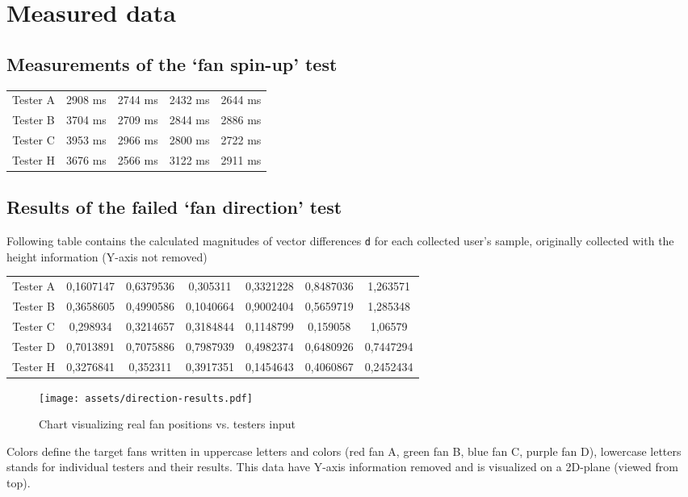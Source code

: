 \chapter{Measured data}

\label{appx:a}
\section{Measurements of the `fan spin-up' test}

\begin{center}
    \begin{tabular}{|c|c|c|c|c|}
    \hline
    Tester A & 2908 ms & 2744 ms & 2432 ms & 2644 ms \\
    Tester B & 3704 ms & 2709 ms & 2844 ms & 2886 ms \\
    Tester C & 3953 ms & 2966 ms & 2800 ms & 2722 ms \\
    Tester H & 3676 ms & 2566 ms & 3122 ms & 2911 ms \\
    \hline
\end{tabular}
\end{center}

\label{appx:b}
\section{Results of the failed `fan direction' test}
Following table contains the calculated magnitudes of vector differences \texttt{d}
for each collected user’s sample, originally collected with the
height information (Y-axis not removed)


\begin{center}
\begin{tabular}{|c|c|c|c|c|c|c|}
\hline
Tester A & 0,1607147 & 0,6379536 & 0,305311 & 0,3321228 & 0,8487036 & 1,263571 \\ 
Tester B & 0,3658605 & 0,4990586 & 0,1040664 & 0,9002404 & 0,5659719 & 1,285348 \\ 
Tester C & 0,298934 & 0,3214657 & 0,3184844 & 0,1148799 & 0,159058 & 1,06579 \\ 
Tester D & 0,7013891 & 0,7075886 & 0,7987939 & 0,4982374 & 0,6480926 & 0,7447294 \\ 
Tester H & 0,3276841 & 0,352311 & 0,3917351 & 0,1454643 & 0,4060867 & 0,2452434 \\ 
\hline
\end{tabular}
\end{center}

\begin{figure}[h]{}
\centering\texttt{[image: assets/direction-results.pdf]}
\caption{Chart visualizing real fan positions vs. testers input}
\end{figure}

Colors define the target fans written in uppercase letters and colors
(red fan A, green fan B, blue fan C, purple fan D),
lowercase letters stands for individual testers and their results. This data
have Y-axis information removed and is visualized on a 2D-plane
(viewed from top).